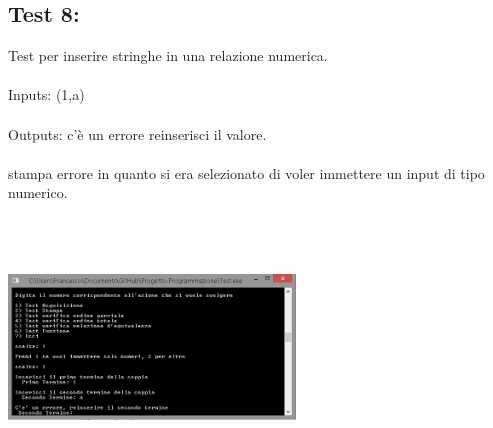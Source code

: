 \documentclass[11pt, a4paper, titlepage, block]{article}
\begin{document}
	\subsection{Test 8:}
	Test per inserire stringhe in una relazione numerica.\\
	\\
	Inputs: (1,a) \\
	\\
	Outputs: c'\`e un errore reinserisci il valore.\\
	\\
	stampa errore in quanto si era selezionato di voler immettere un input di tipo numerico.\\
	\includegraphics[width=3in,height=3in,viewport=0 0 300 300]{../Screenshots/Test8Input.png}
	\\
	\\
	\newpage
\end{document}
